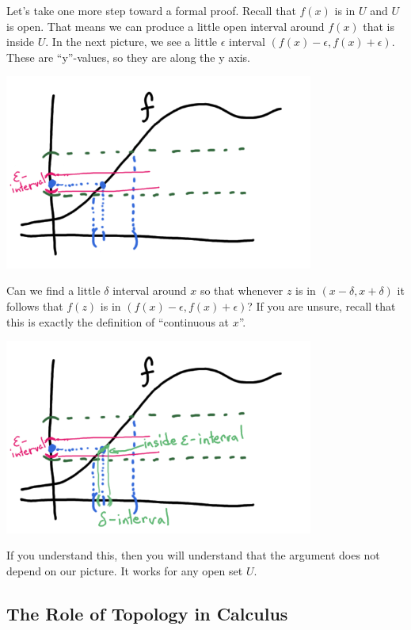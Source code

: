 \documentclass[11pt]{book}
\numberwithin{example}{chapter}
\begin{document}
Let's take one more step toward a formal proof.  Recall that $f(x)$ is in $U$ and $U$ is open.  That means we can produce a little open interval around $f(x)$ that is inside $U$.  In the next picture, we see a little $\epsilon$ interval $(f(x)-\epsilon, f(x)+\epsilon)$.  These are ``y''-values, so they are along the y axis.  

\begin{center}
\includegraphics[width=4in]{toplec1_7.png}
\end{center}


Can we find a little $\delta$ interval around $x$ so that whenever $z$ is in  $(x-\delta,x+\delta)$ it follows that  $f(z)$ is in $(f(x)-\epsilon, f(x)+\epsilon)$?  If you are unsure, recall that this is exactly the definition of ``continuous at $x$''. 


\begin{center}
\includegraphics[width=4in]{toplec1_8.png}
\end{center}


If you understand this, then you will understand that the argument does not depend on our picture.  It works for any open set $U$.  


\subsection{The Role of Topology in Calculus}
\end{document}
